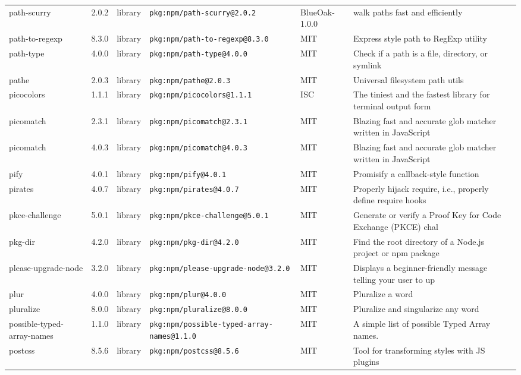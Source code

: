 \documentclass[11pt]{article}
\begin{document}
\begin{longtable}{|l|l|l|p{2.2cm}|l|p{4cm}|}
path-scurry & 2.0.2 & library & \texttt{pkg:npm/path-scurry@2.0.2} & BlueOak-1.0.0 & walk paths fast and efficiently \\
path-to-regexp & 8.3.0 & library & \texttt{pkg:npm/path-to-regexp@8.3.0} & MIT & Express style path to RegExp utility \\
path-type & 4.0.0 & library & \texttt{pkg:npm/path-type@4.0.0} & MIT & Check if a path is a file, directory, or symlink \\
pathe & 2.0.3 & library & \texttt{pkg:npm/pathe@2.0.3} & MIT & Universal filesystem path utils \\
picocolors & 1.1.1 & library & \texttt{pkg:npm/picocolors@1.1.1} & ISC & The tiniest and the fastest library for terminal output form \\
picomatch & 2.3.1 & library & \texttt{pkg:npm/picomatch@2.3.1} & MIT & Blazing fast and accurate glob matcher written in JavaScript \\
picomatch & 4.0.3 & library & \texttt{pkg:npm/picomatch@4.0.3} & MIT & Blazing fast and accurate glob matcher written in JavaScript \\
pify & 4.0.1 & library & \texttt{pkg:npm/pify@4.0.1} & MIT & Promisify a callback-style function \\
pirates & 4.0.7 & library & \texttt{pkg:npm/pirates@4.0.7} & MIT & Properly hijack require, i.e., properly define require hooks \\
pkce-challenge & 5.0.1 & library & \texttt{pkg:npm/pkce-challenge@5.0.1} & MIT & Generate or verify a Proof Key for Code Exchange (PKCE) chal \\
pkg-dir & 4.2.0 & library & \texttt{pkg:npm/pkg-dir@4.2.0} & MIT & Find the root directory of a Node.js project or npm package \\
please-upgrade-node & 3.2.0 & library & \texttt{pkg:npm/please-upgrade-node@3.2.0} & MIT & Displays a beginner-friendly message telling your user to up \\
plur & 4.0.0 & library & \texttt{pkg:npm/plur@4.0.0} & MIT & Pluralize a word \\
pluralize & 8.0.0 & library & \texttt{pkg:npm/pluralize@8.0.0} & MIT & Pluralize and singularize any word \\
possible-typed-array-names & 1.1.0 & library & \texttt{pkg:npm/possible-typed-array-names@1.1.0} & MIT & A simple list of possible Typed Array names. \\
postcss & 8.5.6 & library & \texttt{pkg:npm/postcss@8.5.6} & MIT & Tool for transforming styles with JS plugins \\

\end{longtable}
\end{document}
